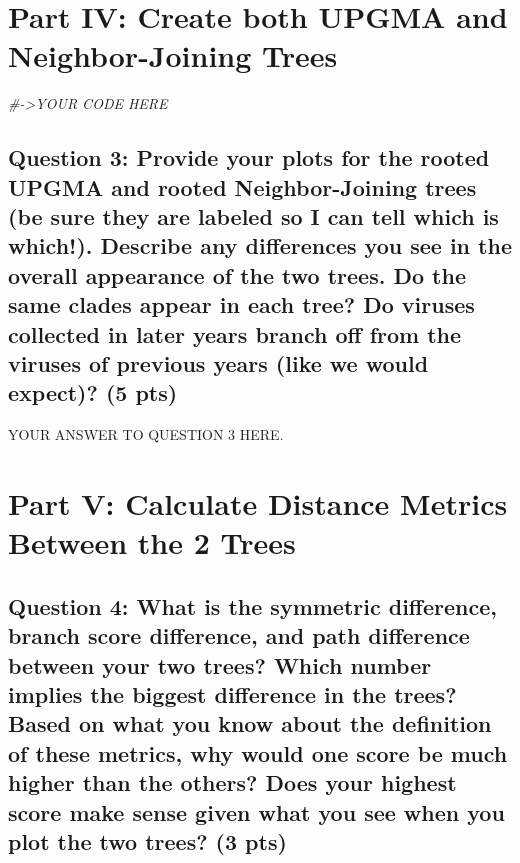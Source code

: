 \documentclass[
]{article}
\newenvironment{Shaded}{\begin{snugshade}}{\end{snugshade}}
\newcommand{\CommentTok}[1]{\textcolor[rgb]{0.56,0.35,0.01}{\textit{#1}}}
\begin{document}
\section{Part IV: Create both UPGMA and Neighbor-Joining
Trees}\label{part-iv-create-both-upgma-and-neighbor-joining-trees}

\begin{Shaded}
\begin{Highlighting}[]
\CommentTok{\#{-}\textgreater{}YOUR CODE HERE}
\end{Highlighting}
\end{Shaded}

\subsection{Question 3: Provide your plots for the rooted UPGMA and
rooted Neighbor-Joining trees (be sure they are labeled so I can tell
which is which!). Describe any differences you see in the overall
appearance of the two trees. Do the same clades appear in each tree? Do
viruses collected in later years branch off from the viruses of previous
years (like we would expect)? (5
pts)}\label{question-3-provide-your-plots-for-the-rooted-upgma-and-rooted-neighbor-joining-trees-be-sure-they-are-labeled-so-i-can-tell-which-is-which.-describe-any-differences-you-see-in-the-overall-appearance-of-the-two-trees.-do-the-same-clades-appear-in-each-tree-do-viruses-collected-in-later-years-branch-off-from-the-viruses-of-previous-years-like-we-would-expect-5-pts}

YOUR ANSWER TO QUESTION 3 HERE.

\section{Part V: Calculate Distance Metrics Between the 2
Trees}\label{part-v-calculate-distance-metrics-between-the-2-trees}

\subsection{Question 4: What is the symmetric difference, branch score
difference, and path difference between your two trees? Which number
implies the biggest difference in the trees? Based on what you know
about the definition of these metrics, why would one score be much
higher than the others? Does your highest score make sense given what
you see when you plot the two trees? (3
pts)}\label{question-4-what-is-the-symmetric-difference-branch-score-difference-and-path-difference-between-your-two-trees-which-number-implies-the-biggest-difference-in-the-trees-based-on-what-you-know-about-the-definition-of-these-metrics-why-would-one-score-be-much-higher-than-the-others-does-your-highest-score-make-sense-given-what-you-see-when-you-plot-the-two-trees-3-pts}
\end{document}
